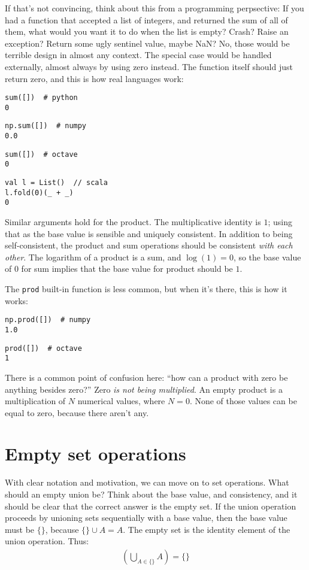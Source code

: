 \documentclass{article}
\begin{document}
If that's not convincing, think about this from a programming perpsective: If you had a function that accepted a list of integers, and returned the sum of all of them, what would you want it to do when the list is empty? Crash? Raise an exception? Return some ugly sentinel value, maybe NaN? No, those would be terrible design in almost any context. The special case would be handled externally, almost always by using zero instead. The function itself should just return zero, and this is how real languages work:
\begin{verbatim}
sum([])  # python
0
\end{verbatim}
\begin{verbatim}
np.sum([])  # numpy
0.0
\end{verbatim}
\begin{verbatim}
sum([])  # octave
0
\end{verbatim}
\begin{verbatim}
val l = List()  // scala
l.fold(0)(_ + _)
0
\end{verbatim}

Similar arguments hold for the product. The multiplicative identity is $1$; using that as the base value is sensible and uniquely consistent. In addition to being self-consistent, the product and sum operations should be consistent \textit{with each other}. The logarithm of a product is a sum, and $\log(1) = 0$, so the base value of $0$ for sum implies that the base value for product should be $1$.

The \texttt{prod} built-in function is less common, but when it's there, this is how it works:

\begin{verbatim}
np.prod([])  # numpy
1.0
\end{verbatim}
\begin{verbatim}
prod([])  # octave
1
\end{verbatim}

There is a common point of confusion here: ``how can a product with zero be anything besides zero?'' Zero \textit{is not being multiplied}. An empty product is a multiplication of $N$ numerical values, where $N=0$. None of those values can be equal to zero, because there aren't any.

\section{Empty set operations}
With clear notation and motivation, we can move on to set operations. What should an empty union be? Think about the base value, and consistency, and it should be clear that the correct answer is the empty set. If the union operation proceeds by unioning sets sequentially with a base value, then the base value must be $\{\}$, because $\{\} \cup A = A$. The empty set is the identity element of the union operation. Thus:
\begin{align} 
\left(\bigcup\limits_{A \in \{\}} A\right) = \{\}
\end{align}
\end{document}

